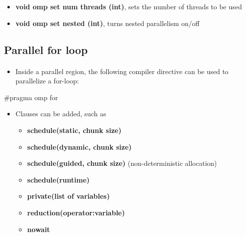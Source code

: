 \documentclass[%
twoside,                 %
final,                   %
10pt]{article}
\begin{document}
{\begin{itemize}
\item \textbf{void omp set num threads (int)}, sets the number of threads to be used

\item \textbf{void omp set nested (int)},  turns nested parallelism on/off
\end{itemize}

\noindent



\subsection{Parallel for loop}

\paragraph{}
\begin{itemize}
 \item Inside a parallel region, the following compiler directive can be used to parallelize a for-loop:
\end{itemize}

\noindent
\bcppcod
#pragma omp for
\ecppcod
\begin{itemize}
\item Clauses can be added, such as
\begin{itemize}

  \item \textbf{schedule(static, chunk size)}

  \item \textbf{schedule(dynamic, chunk size)} 

  \item \textbf{schedule(guided, chunk size)} (non-deterministic allocation)

  \item \textbf{schedule(runtime)}

  \item \textbf{private(list of variables)}

  \item \textbf{reduction(operator:variable)}

  \item \textbf{nowait}
\end{itemize}

\noindent
\end{itemize}

\noindent



}
\end{document}
